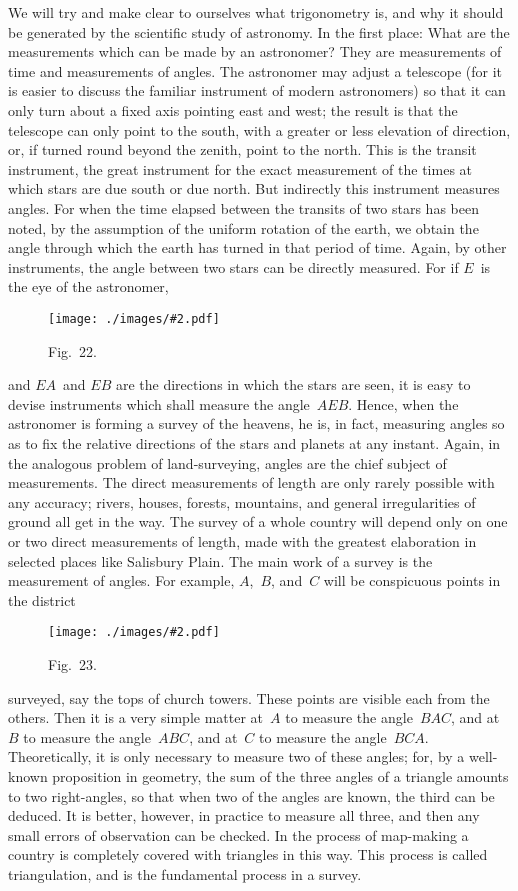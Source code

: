 \documentclass[12pt,leqno]{book}[2005/09/16]
\newcommand{\Graphic}[2]{%
  \phantomsection\label{fig:#2}%
  \texttt{[image: ./images/\#2.pdf]}%
}
\newcommand{\DefWidth}{4in}%
\newcommand{\Figure}[2][\DefWidth]{%
  \begin{figure}[hbt!]
    \centering
    \phantomsection\label{fig:#2}
    \Graphic{#1}{fig#2}
    \caption{Fig.~#2.}
  \end{figure}\ignorespaces%
}
\newcommand{\PageSep}[1]{\ignorespaces}
\begin{document}
We will try and make clear to ourselves
what trigonometry is, and why it should be
generated by the scientific study of astronomy.
%
In the first place: What are the measurements
which can be made by an astronomer?
They are measurements of time and measurements
of angles. The astronomer may adjust
a telescope (for it is easier to discuss the
familiar instrument of modern astronomers)
so that it can only turn about a fixed axis
pointing east and west; the result is that
the telescope can only point to the south, with
a greater or less elevation of direction, or, if
turned round beyond the zenith, point to the
north. This is the transit instrument, the
\PageSep{175}
great instrument for the exact measurement
of the times at which stars are due south or
due north. But indirectly this instrument
measures angles. For when the time elapsed
between the transits of two stars has been
noted, by the assumption of the uniform
rotation of the earth, we obtain the angle
through which the earth has turned in that
period of time. Again, by other instruments,
the angle between two stars can be directly
measured. For if $E$~is the eye of the astronomer,
\Figure[2in]{22}
and $EA$~and $EB$ are the directions in
which the stars are seen, it is easy to devise
instruments which shall measure the angle~$AEB$.
Hence, when the astronomer is forming
a survey of the heavens, he is, in fact,
measuring angles so as to fix the relative
directions of the stars and planets at any instant.
Again, in the analogous problem of
\PageSep{176}
%
%
land-surveying, angles are the chief subject
of measurements. The direct measurements
of length are only rarely possible with any
accuracy; rivers, houses, forests, mountains,
and general irregularities of ground all get in
the way. The survey of a whole country will
depend only on one or two direct measurements
of length, made with the greatest
elaboration in selected places like Salisbury
Plain. The main work of a survey is the
measurement of angles. For example, $A$,~$B$,
and~$C$ will be conspicuous points in the district
\Figure[2in]{23}
surveyed, say the tops of church towers.
These points are visible each from the others.
Then it is a very simple matter at~$A$ to
measure the angle~$BAC$, and at~$B$ to measure
the angle~$ABC$, and at~$C$ to measure the angle~$BCA$.
Theoretically, it is only necessary to
measure two of these angles; for, by a well-known
proposition in geometry, the sum of
the three angles of a triangle amounts to two
\PageSep{177}
right-angles, so that when two of the angles
are known, the third can be deduced. It is
better, however, in practice to measure all
three, and then any small errors of observation
can be checked. In the process of map-making
a country is completely covered with
triangles in this way. This process is called
triangulation, and is the fundamental process
%
in a survey.
\end{document}
